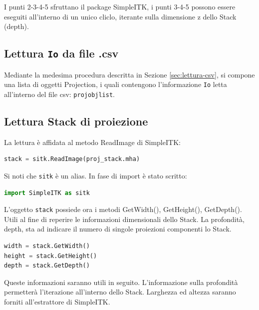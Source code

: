 \documentclass[a4paper,12pt, doubleside]{report}
\begin{document}
                I punti 2-3-4-5 sfruttano il package SimpleITK, i punti 3-4-5 possono essere eseguiti all'interno di un unico cliclo, iterante sulla dimensione z dello Stack (depth).
                
            \subsection{Lettura \texttt{Io} da file .csv}
                \par
                    Mediante la medesima procedura descritta in Sezione \ref{sec:lettura-csv}, si compone una lista di oggetti Projection, i quali contengono l'informazione \texttt{Io} letta all'interno del file csv: \texttt{proj\textunderscore obj\textunderscore list}.
                
            \subsection{Lettura Stack di proiezione}
                \par
                    La lettura è affidata al metodo ReadImage\cite{sitk-readimage} di SimpleITK:
                    
                    \begin{lstlisting}[language=python, frame=bt]
stack = sitk.ReadImage(proj_stack.mha)
                    \end{lstlisting}
                    
                    Si noti che \texttt{sitk} è un alias. In fase di import è stato scritto:
                    \begin{lstlisting}[language=python, frame=bt]
import SimpleITK as sitk
                    \end{lstlisting}
                    
                    L'oggetto \texttt{stack} possiede ora i metodi GetWidth(), GetHeight(), GetDepth(). Utili al fine di reperire le informazioni dimensionali dello Stack. La profondità, depth, sta ad indicare il numero di singole proiezioni componenti lo Stack.
                    
                    \begin{lstlisting}[language=python, frame=bt]
width = stack.GetWidth()
height = stack.GetHeight()
depth = stack.GetDepth()
                    \end{lstlisting} 
             
                    Queste informazioni saranno utili in seguito. L'informazione sulla profondità permetterà l'iterazione all'interno dello Stack. Larghezza ed altezza saranno forniti all'estrattore di SimpleITK.
                    
\end{document}
